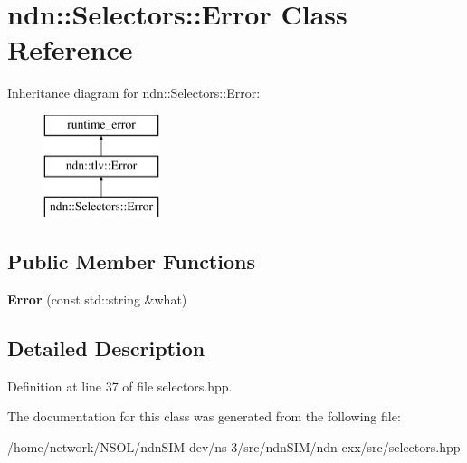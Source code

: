 \hypertarget{classndn_1_1Selectors_1_1Error}{}\section{ndn\+:\+:Selectors\+:\+:Error Class Reference}
\label{classndn_1_1Selectors_1_1Error}
Inheritance diagram for ndn\+:\+:Selectors\+:\+:Error\+:\begin{figure}[H]
\begin{center}
\leavevmode
\includegraphics[height=3.000000cm]{classndn_1_1Selectors_1_1Error}
\end{center}
\end{figure}
\subsection*{Public Member Functions}
\begin{DoxyCompactItemize}
\item 
{\bfseries Error} (const std\+::string \&what)\hypertarget{classndn_1_1Selectors_1_1Error_a1221ded6ffbba826e88bbb75e45d1488}{}\label{classndn_1_1Selectors_1_1Error_a1221ded6ffbba826e88bbb75e45d1488}

\end{DoxyCompactItemize}


\subsection{Detailed Description}


Definition at line 37 of file selectors.\+hpp.



The documentation for this class was generated from the following file\+:\begin{DoxyCompactItemize}
\item 
/home/network/\+N\+S\+O\+L/ndn\+S\+I\+M-\/dev/ns-\/3/src/ndn\+S\+I\+M/ndn-\/cxx/src/selectors.\+hpp\end{DoxyCompactItemize}
